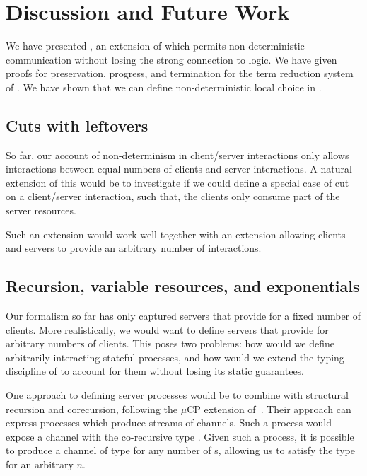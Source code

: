 \documentclass[UKenglish]{llncs}
\begin{document}
\section{Discussion and Future Work}\label{sec:discussion}
We have presented \nodcap, an extension of \hcp which permits non-deterministic communication without losing the strong connection to logic.
We have given proofs for preservation, progress, and termination for the term reduction system of \nodcap.
We have shown that we can define non-deterministic local choice in \nodcap.

\subsection{Cuts with leftovers}
So far, our account of non-determinism in client/server interactions only allows
interactions between equal numbers of clients and server interactions. A natural
extension of this would be to investigate if we could define a special case of
cut on a client/server interaction, such that, \eg the clients only consume
part of the server resources.
\begin{prooftree}
\end{prooftree}
Such an extension would work well together with an extension allowing clients
and servers to provide an arbitrary number of interactions.

\subsection{Recursion, variable resources, and exponentials}
Our formalism so far has only captured servers that provide for a fixed number of clients.  More realistically, we would want to define servers that provide for arbitrary numbers of clients.  This poses two problems: how would we define arbitrarily-interacting stateful processes, and how would we extend the typing discipline of \nodcap to account for them without losing its static guarantees.

One approach to defining server processes would be to combine \nodcap with structural recursion and corecursion, following the $\mu\text{CP}$ extension of~\textcite{lindley2016}.  Their approach can express processes which produce streams of  channels. Such a process would expose a channel with the co-recursive type .  Given such a process, it is possible to produce a channel of type  for any number of s, allowing us to satisfy the type  for an arbitrary $n$.
\end{document}
